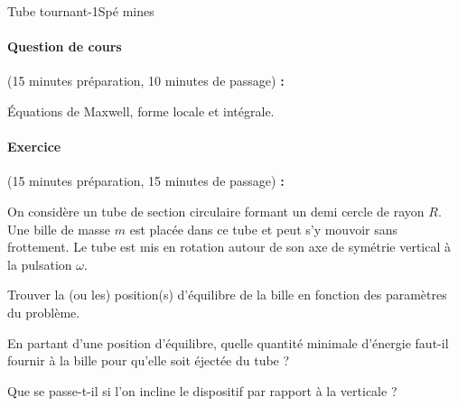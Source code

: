 \begin{exercise}{Tube tournant}{-1}{Spé}
{}{mines}

\paragraph{Question de cours} \textsf{(15 minutes préparation, 10 minutes de passage) \textbf{:}}

Équations de Maxwell, forme locale et intégrale.

\paragraph{Exercice} \textsf{(15 minutes préparation, 15 minutes de passage) \textbf{:}}

On considère un tube de section circulaire formant un demi cercle de rayon $R$. Une bille de masse $m$ est placée dans ce tube et peut s'y mouvoir sans frottement. Le tube est mis en rotation autour de son axe de symétrie vertical à la pulsation $\omega$.


\begin{center}
\end{center}

\begin{questions}
\question Trouver la (ou les) position(s) d'équilibre de la bille en fonction des paramètres du problème.

\question En partant d'une position d'équilibre, quelle quantité minimale d'énergie faut-il fournir à la bille pour qu'elle soit éjectée du tube ?

\question Que se passe-t-il si l'on incline le dispositif par rapport à la verticale ?
\end{questions}

\end{exercise}
